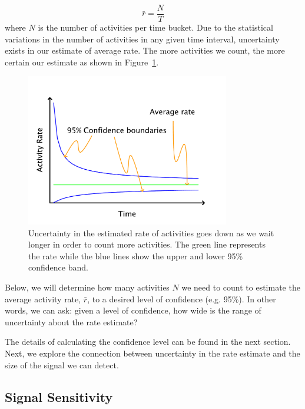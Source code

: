 \documentclass{article}
\begin{document}
\begin{equation}
    \label{eq:rateEst}
    \bar{r} = \frac{N}{T}
\end{equation}
where $N$ is the number of activities per time bucket. Due to the statistical
variations in the number of activities in any given time interval, uncertainty exists in our estimate of average rate. 
The more activities we count, the more certain our estimate as shown in Figure~\ref{fig:confidence}.

%
\begin{figure}[h]
	\begin{center}
		\includegraphics[width=3.5in]{./imgs/fig2.pdf}
	\end{center}
	\caption{Uncertainty in the estimated rate of activities goes down as we wait longer in order to count more activities.  The green line
represents the rate while the blue lines show the upper and lower 95\% confidence band. }
    	\label{fig:confidence}
\end{figure}
%
%

Below, we will determine how many activities $N$ we need to count to estimate the average activity rate, $\bar{r}$, to a desired level
of confidence (e.g. 95\%). In other words, we can ask: given a level of confidence, how wide is the range of uncertainty
about the rate estimate?

The details of calculating the confidence level can be found in the next section.  Next, we explore the connection between
uncertainty in the rate estimate and the size of the signal we can detect.


\subsection{Signal Sensitivity}
\end{document}
